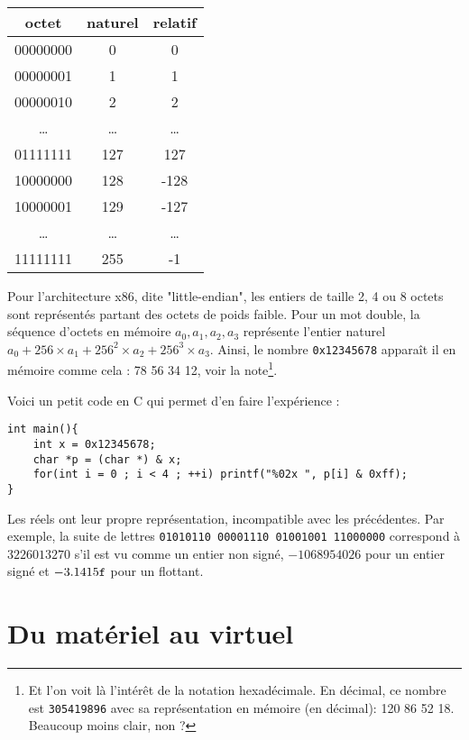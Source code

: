 \documentclass{book}
\newcommand{\C}{\textsc{C}\xspace}
\newcommand{\code}[1]{\texttt{#1}}
\begin{document}
{\begin{center}
	\begin{tabular}{| c | c | c |}
		\hline
		octet & naturel & relatif\\
		\hline
		00000000 & 0 & 0\\
		\hline 00000001 & 1 & 1\\
		\hline 00000010 & 2 & 2\\
		\hline \ldots & \ldots & \ldots\\
		\hline 01111111 & 127 & 127\\
		\hline 10000000 & 128 & -128\\
		\hline 10000001 & 129 & -127\\
		\hline \ldots& \ldots & \ldots\\
		\hline 11111111 & 255 & -1\\
		\hline
	\end{tabular}
\end{center}

Pour l'architecture {\sc x86}, dite "little-endian", les entiers de taille 2, 4 ou 8 octets sont représentés partant des octets de poids faible. Pour un mot double, la séquence d'octets en mémoire $a_0, a_1, a_2, a_3$ représente l'entier naturel $a_0 + 256 \times a_1 + 256^2 \times a_2 + 256^3 \times a_3$. Ainsi, le nombre \code{0x12345678} apparaît il en mémoire comme cela : 
78 56 34 12, voir la note\footnote{Et l'on voit là l'intérêt de la notation hexadécimale. En décimal, ce nombre est \code{305419896} avec sa représentation en mémoire (en décimal): 120 86 52 18. Beaucoup moins clair, non ? }.

Voici un petit code en \C qui permet d'en faire l'expérience :
\begin{verbatim}
int main(){
	int x = 0x12345678;
	char *p = (char *) & x;
	for(int i = 0 ; i < 4 ; ++i) printf("%02x ", p[i] & 0xff);
}
\end{verbatim}

Les réels ont leur propre représentation, incompatible avec les précédentes. Par exemple, la suite de lettres {\tt 01010110\ 00001110\ 01001001\ 11000000} correspond à  $3226013270$ s'il est vu comme un entier non signé, $-1068954026$ pour un entier signé et  $-3.1415{\tt f}$ pour un flottant. 

\section{Du matériel au virtuel}

}
\end{document}
